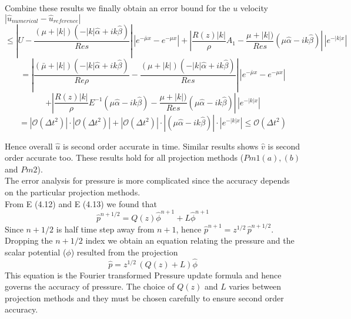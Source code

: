 Combine these results we finally obtain an error bound for the $u$ velocity\\

$| \hat{u}_{numerical} - \hat{u}_{reference} | $
\begin{equation*}
\leq |U - \dfrac{(\mu + |k|) (-|k| \hat{\alpha} + ik \hat{\beta})}{Re s}| \, |e^{-\bar{\mu} x} - e^{-\mu x} | + | \dfrac{R(z) |k|}{\rho} A_1 - \dfrac{\mu + |k|)}{Re s} (\mu \hat{\alpha} - ik \hat{\beta}) | \, |e^{- |k|x}|
\end{equation*}
\begin{equation*}
= | \dfrac{(\bar{\mu} + |k|) (-|k| \hat{\alpha} + ik \hat{\beta})}{Re \rho} - \dfrac{(\mu + |k|) (-|k| \hat{\alpha} + ik \hat{\beta})}{Re s} |\, |e^{-\bar{\mu} x} - e^{-\mu x} | 
\end{equation*}
\begin{equation*}
+ | \dfrac{R(z) |k|}{\rho} E^{-1} (\mu \hat{\alpha} - ik \hat{\beta}) - \dfrac{\mu + |k|)}{Re s} (\mu \hat{\alpha} - ik \hat{\beta}) | \, |e^{- |k|x}|
\end{equation*}
\begin{equation*}
= | \mathcal{O} (\Delta t^2) |\cdot |\mathcal{O} (\Delta t^2)| + |\mathcal{O} (\Delta t^2)| \cdot| (\mu \hat{\alpha} - ik \hat{\beta}) | \cdot |e^{- |k|x}|
\leq \mathcal{O} (\Delta t^2) 
\end{equation*}

Hence overall $\hat{u}$ is second order accurate in time. Similar results shows $\hat{v}$ is second order accurate too. These results hold for all projection methods ($Pm 1 (a), (b)$ and $Pm 2$).\\

The error analysis for pressure is more complicated since the accuracy depends on the particular projection methods.\\

From E (4.12) and E (4.13) we found that
\begin{equation*}
\hat{p}^{n+1/2} = Q(z)\hat{\phi}^{n+1} + L\hat{\phi}^{n+1}
\end{equation*}
Since $n + 1/2$ is half time step away from $n+1$, hence $\hat{p}^{n+1} = z^{1/2} \, \hat{p}^{n+1/2}$. Dropping the $n+1/2$ index we obtain an equation relating the pressure and the scalar potential ($\phi$) resulted from the projection\\
\begin{equation}
\hat{p} = z^{1/2} \, (Q(z) + L)\hat{\phi}
\end{equation}
This equation is the Fourier transformed Pressure update formula and hence governs the accuracy of pressure. The choice of $Q(z)$ and $L$ varies between projection methods and they must be chosen carefully to ensure second order accuracy.\\

